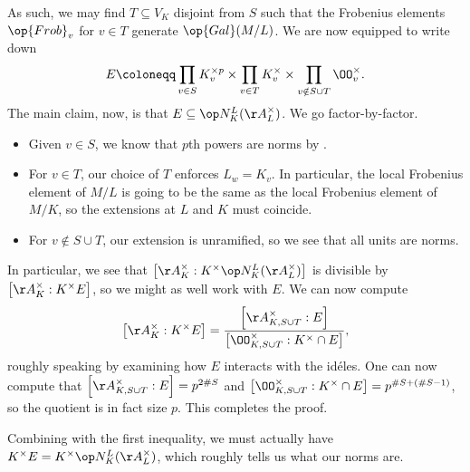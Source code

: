 \documentclass[../notes.tex]{subfiles}
\begin{document}
As such, we may find $T\subseteq V_K$ disjoint from $S$ such that the Frobenius elements $\op{Frob}_v$ for $v\in T$ generate $\op{Gal}(M/L)$. We are now equipped to write down
\[E\coloneqq\prod_{v\in S}K_v^{\times p}\times\prod_{v\in T}K_v^\times\times\prod_{v\notin S\cup T}\OO_v^\times.\]
The main claim, now, is that $E\subseteq\op N^L_K(\AA_L^\times)$. We go factor-by-factor.
\begin{itemize}
	\item Given $v\in S$, we know that $p$th powers are norms by .
	\item For $v\in T$, our choice of $T$ enforces $L_w=K_v$. In particular, the local Frobenius element of $M/L$ is going to be the same as the local Frobenius element of $M/K$, so the extensions at $L$ and $K$ must coincide.
	\item For $v\notin S\cup T$, our extension is unramified, so we see that all units are norms.
\end{itemize}
In particular, we see that $\left[\AA_K^\times:K^\times\op N^L_K(\AA_L^\times)\right]$ is divisible by $\left[\AA_K^\times:K^\times E\right]$, so we might as well work with $E$. We can now compute
\[\left[\AA_K^\times:K^\times E\right]=\frac{\left[\AA_{K,S\cup T}^\times:E\right]}{\left[\OO_{K,S\cup T}^\times:K^\times\cap E\right]},\]
roughly speaking by examining how $E$ interacts with the id\'eles. One can now compute that $\left[\AA_{K,S\cup T}^\times:E\right]=p^{2\#S}$ and $\left[\OO_{K,S\cup T}^\times:K^\times\cap E\right]=p^{\#S+(\#S-1)}$, so the quotient is in fact size $p$. This completes the proof.
\begin{remark}
	Combining with the first inequality, we must actually have $K^\times E=K^\times\op N^L_K(\AA_L^\times)$, which roughly tells us what our norms are.
\end{remark}
\end{document}
